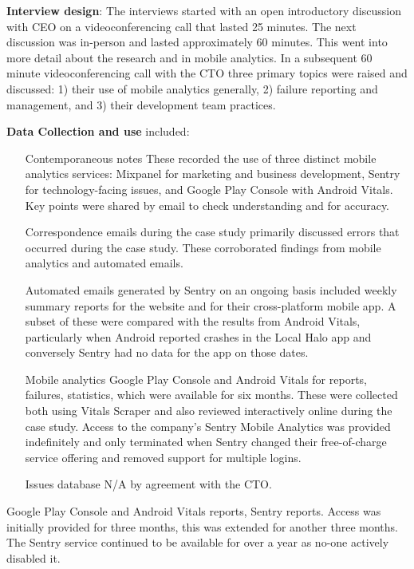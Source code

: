 \textbf{Interview design}: The interviews started with an open introductory discussion with CEO on a videoconferencing call that lasted 25 minutes. The next discussion was in-person and lasted approximately 60 minutes. This went into more detail about the research and in mobile analytics. In a subsequent 60 minute  videoconferencing call with the CTO three primary topics were raised and discussed: 1) their use of mobile analytics generally, 2) failure reporting and management, and 3) their development team practices.
   
\textbf{Data Collection and use} included:

\begin{itemize}
    \item[Contemporaneous notes] These recorded the use of three distinct mobile analytics services: Mixpanel for marketing and business development, Sentry for technology-facing issues, and Google Play Console with Android Vitals. Key points were shared by email to check understanding and for accuracy.
    \item[Correspondence emails] during the case study primarily discussed errors that occurred during the case study. These corroborated findings from mobile analytics and automated emails.
    \item[Automated emails] generated by Sentry on an ongoing basis included weekly summary reports for the website and for their cross-platform mobile app. A subset of these were compared with the results from Android Vitals, particularly when Android reported crashes in the Local Halo app and conversely Sentry had no data for the app on those dates.
    \item[Mobile analytics] Google Play Console and Android Vitals for reports, failures, statistics, which were available for six months. These were collected both using Vitals Scraper and also reviewed interactively online during the case study. Access to the company's Sentry Mobile Analytics was provided indefinitely and only terminated when Sentry changed their free-of-charge service offering and removed support for multiple logins. 
    \item[Issues database] N/A by agreement with the CTO.
\end{itemize}

Google Play Console and Android Vitals reports, Sentry reports. Access was initially provided for three months, this was extended for another three months. The Sentry service continued to be available for over a year as no-one actively disabled it. 

